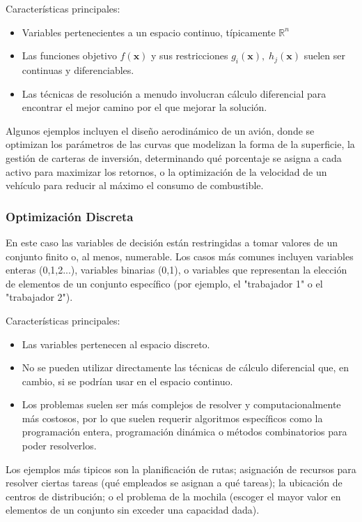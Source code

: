 \documentclass[12pt,a4paper]{book}
\begin{document}
Características principales:
\begin{itemize}
    \item Variables pertenecientes a un espacio continuo, típicamente $\mathbb{R}^n$
    \item Las funciones objetivo $f(\mathbf{x})$ y sus restricciones $g_i(\mathbf{x}), \;h_j(\mathbf{x})$ suelen ser continuas y diferenciables.
    \item Las técnicas de resolución a menudo involucran cálculo diferencial para encontrar el mejor camino por el que mejorar la solución.
\end{itemize}
Algunos ejemplos incluyen el diseño aerodinámico de un avión, donde se optimizan los parámetros de las curvas que modelizan la forma de la superficie, la gestión de carteras de inversión, determinando qué porcentaje se asigna a cada activo para maximizar los retornos, o la optimización de la velocidad de un vehículo para reducir al máximo el consumo de combustible.

\subsubsection{Optimización Discreta}
En este caso las variables de decisión están restringidas a tomar valores de un conjunto finito o, al menos, numerable. Los casos más comunes incluyen variables enteras (0,1,2...), variables binarias (0,1), o variables que representan la elección de elementos de un conjunto específico (por ejemplo, el "trabajador 1" o el "trabajador 2").

Características principales:
\begin{itemize}
    \item Las variables pertenecen al espacio discreto.
    \item No se pueden utilizar directamente las técnicas de cálculo diferencial que, en cambio, si se podrían usar en el espacio continuo.
    \item Los problemas suelen ser más complejos de resolver y computacionalmente más costosos, por lo que suelen requerir algoritmos específicos como la programación entera, programación dinámica o métodos combinatorios para poder resolverlos.
\end{itemize}
Los ejemplos más tipicos son la planificación de rutas; asignación de recursos para resolver ciertas tareas (qué empleados se asignan a qué tareas); la ubicación de centros de distribución; o el problema de la mochila (escoger el mayor valor en elementos de un conjunto sin exceder una capacidad dada).
\end{document}
